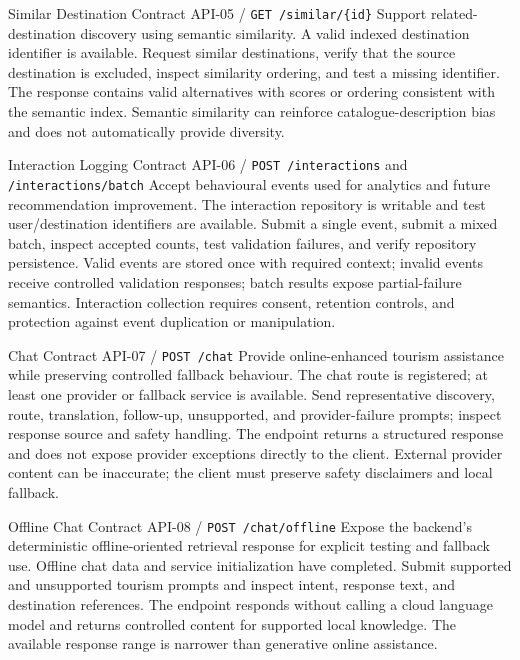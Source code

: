 \EvidenceSheet
{Similar Destination Contract}
{API-05 / \texttt{GET /similar/\{id\}}}
{Support related-destination discovery using semantic similarity.}
{A valid indexed destination identifier is available.}
{Request similar destinations, verify that the source destination is excluded, inspect similarity ordering, and test a missing identifier.}
{The response contains valid alternatives with scores or ordering consistent with the semantic index.}
{Semantic similarity can reinforce catalogue-description bias and does not automatically provide diversity.}

\EvidenceSheet
{Interaction Logging Contract}
{API-06 / \texttt{POST /interactions} and \texttt{/interactions/batch}}
{Accept behavioural events used for analytics and future recommendation improvement.}
{The interaction repository is writable and test user/destination identifiers are available.}
{Submit a single event, submit a mixed batch, inspect accepted counts, test validation failures, and verify repository persistence.}
{Valid events are stored once with required context; invalid events receive controlled validation responses; batch results expose partial-failure semantics.}
{Interaction collection requires consent, retention controls, and protection against event duplication or manipulation.}

\EvidenceSheet
{Chat Contract}
{API-07 / \texttt{POST /chat}}
{Provide online-enhanced tourism assistance while preserving controlled fallback behaviour.}
{The chat route is registered; at least one provider or fallback service is available.}
{Send representative discovery, route, translation, follow-up, unsupported, and provider-failure prompts; inspect response source and safety handling.}
{The endpoint returns a structured response and does not expose provider exceptions directly to the client.}
{External provider content can be inaccurate; the client must preserve safety disclaimers and local fallback.}

\EvidenceSheet
{Offline Chat Contract}
{API-08 / \texttt{POST /chat/offline}}
{Expose the backend's deterministic offline-oriented retrieval response for explicit testing and fallback use.}
{Offline chat data and service initialization have completed.}
{Submit supported and unsupported tourism prompts and inspect intent, response text, and destination references.}
{The endpoint responds without calling a cloud language model and returns controlled content for supported local knowledge.}
{The available response range is narrower than generative online assistance.}


